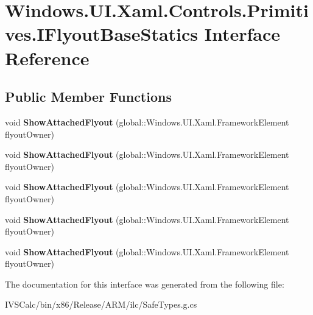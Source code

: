 \hypertarget{interface_windows_1_1_u_i_1_1_xaml_1_1_controls_1_1_primitives_1_1_i_flyout_base_statics}{}\section{Windows.\+U\+I.\+Xaml.\+Controls.\+Primitives.\+I\+Flyout\+Base\+Statics Interface Reference}
\label{interface_windows_1_1_u_i_1_1_xaml_1_1_controls_1_1_primitives_1_1_i_flyout_base_statics}
\subsection*{Public Member Functions}
\begin{DoxyCompactItemize}
\item 
\mbox{\label{interface_windows_1_1_u_i_1_1_xaml_1_1_controls_1_1_primitives_1_1_i_flyout_base_statics_a75008d925b1fdf04c579137db383f892}} 
void {\bfseries Show\+Attached\+Flyout} (global\+::\+Windows.\+U\+I.\+Xaml.\+Framework\+Element flyout\+Owner)
\item 
\mbox{\label{interface_windows_1_1_u_i_1_1_xaml_1_1_controls_1_1_primitives_1_1_i_flyout_base_statics_a75008d925b1fdf04c579137db383f892}} 
void {\bfseries Show\+Attached\+Flyout} (global\+::\+Windows.\+U\+I.\+Xaml.\+Framework\+Element flyout\+Owner)
\item 
\mbox{\label{interface_windows_1_1_u_i_1_1_xaml_1_1_controls_1_1_primitives_1_1_i_flyout_base_statics_a75008d925b1fdf04c579137db383f892}} 
void {\bfseries Show\+Attached\+Flyout} (global\+::\+Windows.\+U\+I.\+Xaml.\+Framework\+Element flyout\+Owner)
\item 
\mbox{\label{interface_windows_1_1_u_i_1_1_xaml_1_1_controls_1_1_primitives_1_1_i_flyout_base_statics_a75008d925b1fdf04c579137db383f892}} 
void {\bfseries Show\+Attached\+Flyout} (global\+::\+Windows.\+U\+I.\+Xaml.\+Framework\+Element flyout\+Owner)
\item 
\mbox{\label{interface_windows_1_1_u_i_1_1_xaml_1_1_controls_1_1_primitives_1_1_i_flyout_base_statics_a75008d925b1fdf04c579137db383f892}} 
void {\bfseries Show\+Attached\+Flyout} (global\+::\+Windows.\+U\+I.\+Xaml.\+Framework\+Element flyout\+Owner)
\end{DoxyCompactItemize}


The documentation for this interface was generated from the following file\+:\begin{DoxyCompactItemize}
\item 
I\+V\+S\+Calc/bin/x86/\+Release/\+A\+R\+M/ilc/Safe\+Types.\+g.\+cs\end{DoxyCompactItemize}
